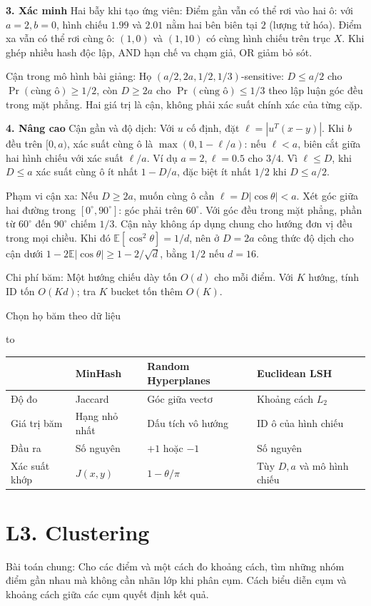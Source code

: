 \documentclass[10pt,a4paper,twocolumn]{article}
\newcommand{\lecture}[2]{%
  \par
  \section{L#1. #2}\label{lecture:#1}}
\newcommand{\key}[1]{#1:\enspace}
\newcommand{\blocklabel}[1]{\par\noindent#1\par\nobreak}
\newenvironment{examtable}[1]{%
  \par\addvspace{2pt}\noindent\hbox to \linewidth\bgroup\hfil
  \setlength{\tabcolsep}{4pt}%
  \renewcommand{\arraystretch}{1.12}\begin{tabular}{#1}%
}{\end{tabular}\hfil\egroup\par\addvspace{2pt}}
\newcommand{\unitheading}[2]{%
  \par\addvspace{1pt}\noindent\textbf{#1. #2}\enspace}
\newcommand{\unitverification}{\unitheading{3}{Xác minh}}
\newcommand{\unitadvanced}{\unitheading{4}{Nâng cao}}
\begin{document}
\unitverification
\key{Hai bẫy khi tạo ứng viên} Điểm gần vẫn có thể rơi vào hai ô: với $a=2,b=0$, hình chiếu $1.99$ và $2.01$ nằm hai bên biên tại $2$ (lượng tử hóa). Điểm xa vẫn có thể rơi cùng ô: $(1,0)$ và $(1,10)$ có cùng hình chiếu trên trục $X$. Khi ghép nhiều hash độc lập, AND hạn chế va chạm giả, OR giảm bỏ sót.

\key{Cận trong mô hình bài giảng} Họ $(a/2,2a,1/2,1/3)$-sensitive: $D\le a/2$ cho $\Pr(\text{cùng ô})\ge1/2$, còn $D\ge2a$ cho $\Pr(\text{cùng ô})\le1/3$ theo lập luận góc đều trong mặt phẳng. Hai giá trị là cận, không phải xác suất chính xác của từng cặp.

\unitadvanced
\key{Cận gần và độ dịch} Với $u$ cố định, đặt $\ell=|u^T(x-y)|$. Khi $b$ đều trên $[0,a)$, xác suất cùng ô là $\max(0,1-\ell/a)$: nếu $\ell<a$, biên cắt giữa hai hình chiếu với xác suất $\ell/a$. Ví dụ $a=2,\ell=0.5$ cho $3/4$. Vì $\ell\le D$, khi $D\le a$ xác suất cùng ô ít nhất $1-D/a$, đặc biệt ít nhất $1/2$ khi $D\le a/2$.

\key{Phạm vi cận xa} Nếu $D\ge2a$, muốn cùng ô cần $\ell=D|\cos\theta|<a$. Xét góc giữa hai đường trong $[0^\circ,90^\circ]$: góc phải trên $60^\circ$. Với góc đều trong mặt phẳng, phần từ $60^\circ$ đến $90^\circ$ chiếm $1/3$. Cận này không áp dụng chung cho hướng đơn vị đều trong mọi chiều. Khi đó $\mathbb E[\cos^2\theta]=1/d$, nên ở $D=2a$ công thức độ dịch cho cận dưới $1-2\mathbb E|\cos\theta|\ge1-2/\sqrt d$, bằng $1/2$ nếu $d=16$.

\key{Chi phí băm} Một hướng chiếu dày tốn $O(d)$ cho mỗi điểm. Với $K$ hướng, tính ID tốn $O(Kd)$; tra $K$ bucket tốn thêm $O(K)$.

\blocklabel{Chọn họ băm theo dữ liệu}
\begin{examtable}{@{}p{}p{}p{.25\columnwidth}p{.25\columnwidth}@{}}
\toprule
 & MinHash & Random Hyperplanes & Euclidean LSH \\
\midrule
Độ đo & Jaccard & Góc giữa vectơ & Khoảng cách $L_2$ \\
Giá trị băm & Hạng nhỏ nhất & Dấu tích vô hướng & ID ô của hình chiếu \\
Đầu ra & Số nguyên & $+1$ hoặc $-1$ & Số nguyên \\
Xác suất khớp & $J(x,y)$ & $1-\theta/\pi$ & Tùy $D,a$ và mô hình chiếu \\
\bottomrule
\end{examtable}

\lecture{3}{Clustering}

\key{Bài toán chung} Cho các điểm và một cách đo khoảng cách, tìm những nhóm điểm gần nhau mà không cần nhãn lớp khi phân cụm. Cách biểu diễn cụm và khoảng cách giữa các cụm quyết định kết quả.
\end{document}

